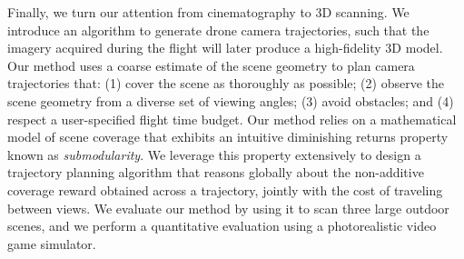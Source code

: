 Finally, we turn our attention from cinematography to 3D scanning.
We introduce an algorithm to generate drone camera trajectories, such that the imagery acquired during the flight will later produce a high-fidelity 3D model. Our method uses a coarse estimate of the scene geometry to plan camera trajectories that: (1) cover the scene as thoroughly as possible; (2) observe the scene geometry from a diverse set of viewing angles; (3) avoid obstacles; and (4) respect a user-specified flight time budget.
Our method relies on a mathematical model of scene coverage that exhibits an intuitive diminishing returns property known as \emph{submodularity}.
We leverage this property extensively to design a trajectory planning algorithm  that reasons globally about the non-additive coverage reward obtained across a trajectory, jointly with the cost of traveling between views.
We evaluate our method by using it to scan three large outdoor scenes, and we perform a quantitative evaluation using a photorealistic video game simulator.
